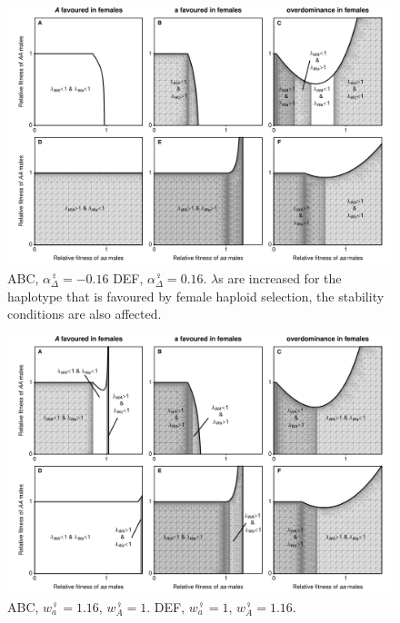 \documentclass[12pt]{article}
\begin{document}
\begin{figure}[!h]
\centering
\centerline{\includegraphics[width=\linewidth]{Region_Plot_combined_FemaleDrive_Mike}}
\caption{
ABC, $\alpha_{\Delta}^\female=-0.16$
DEF, $\alpha_{\Delta}^\female=0.16$. $\lambda$s are increased for the haplotype that is favoured by female haploid selection, the stability conditions are also affected. 
}
\label{fig:regionFemaleDrive}
\end{figure}

\begin{figure}[!h]
\centering
\centerline{\includegraphics[width=\linewidth]{Region_Plot_combined_FemaleGS_Mike}}
\caption{
ABC, $w_{a}^\female=1.16$, $w_{A}^\female=1$.
DEF, $w_{a}^\female=1$, $w_{A}^\female=1.16$. 
}
\label{fig:regionFemaleGS}
\end{figure}
\end{document}
